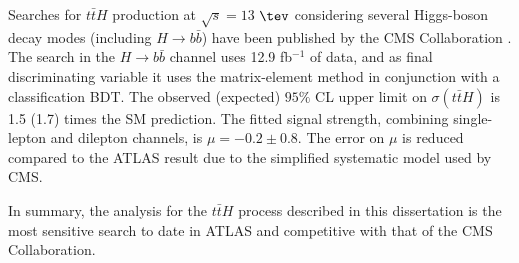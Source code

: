 Searches for $t\bar{t}H$ production at $\sqrt{s}=13$ $\tev$ considering several Higgs-boson decay modes (including $H \to b\bar{b}$) have been published by the CMS Collaboration \cite{CMS-PAS-HIG-16-022,CMS-PAS-HIG-16-038,CMS-PAS-HIG-16-020}. The search in the $H \to b\bar{b}$ channel uses 12.9 fb$^{-1}$ of data, and as final discriminating variable it uses the matrix-element method in conjunction with a classification BDT. The observed (expected) $95\%$ CL upper limit on $\sigma(t\bar{t}H)$ is 1.5 (1.7) times the SM prediction. The fitted signal strength, combining single-lepton and dilepton channels, is $\mu = -0.2\pm0.8$. The error on $\mu$ is reduced compared to the ATLAS result due to the simplified systematic model used by CMS.\par
In summary, the analysis  for the $t\bar{t}H$ process described in this dissertation is the most sensitive search to date in ATLAS and competitive with that of the CMS Collaboration.